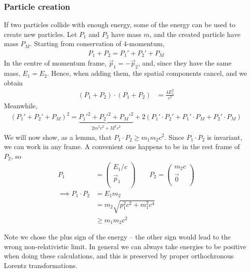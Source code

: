 \documentclass{../template/note}
\begin{document}

    \subsubsection{Particle creation}

    If two particles collide with enough energy, some of the energy can be used to create new particles. Let $P_1$ and $P_2$ have mass $m$, and the created particle have mass $P_M$. Starting from conservation of 4-momentum,
    \begin{align*}
        P_1 + P_2 = P_1' + P_2' + P_M
    \end{align*}
    In the centre of momentum frame, $\vec p_1 = -\vec p_2$, and, since they have the same mass, $E_1 = E_2$. Hence, when adding them, the spatial components cancel, and we obtain
    \begin{align*}
        (P_1+P_2) \cdot (P_1+P_2) &= \frac{4E_1^2}{c^2}
    \end{align*}
    Meanwhile,
    \begin{align*}
        (P_1'+P_2'+P_M)^2 = \underbrace{P_1'^2 + P_2'^2 + P_M'^2}_{2m^2c^2 + M^2c^2} + 2(P_1'\cdot P_2' + P_1'\cdot P_M + P_2' \cdot P_M)
    \end{align*}
    We will now show, as a lemma, that $P_1 \cdot P_2 \geq m_1m_2c^2$. Since $P_1 \cdot P_2$ is invariant, we can work in any frame. A convenient one happens to be in the rest frame of $P_2$, so
    \begin{align*}
        P_1 &= \begin{pmatrix}
            E_1/c \\
            \vec p_1 \\
        \end{pmatrix} \qquad P_2 = \begin{pmatrix}
            m_2c \\
            \vec 0 \\
        \end{pmatrix} \\
        \implies P_1 \cdot P_2 &= E_1m_2 \\
        &= m_2 \sqrt{p_1^2 c^2 + m_1^2 c^4} \\
        &\geq m_1m_2c^2
    \end{align*}
    
    Note we chose the plus sign of the energy -- the other sign would lead to the wrong non-relativistic limit. In general we can always take energies to be positive when doing these calculations, and this is preserved by proper orthochronous Lorentz transformations.
    
\end{document}
